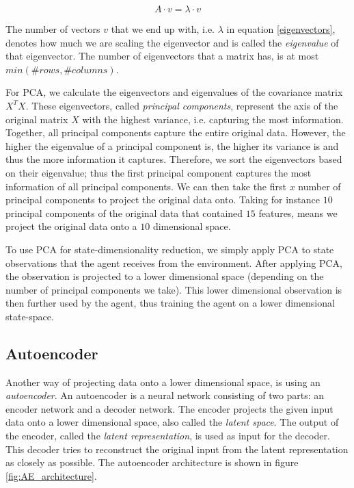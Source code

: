 \begin{equation}
\label{eigenvectors}
A \cdot v = \lambda \cdot v
\end{equation}

The number of vectors $v$ that we end up with, i.e. $\lambda$ in equation \ref{eigenvectors}, denotes how much we are scaling the eigenvector and is called the \emph{eigenvalue} of that eigenvector. The number of eigenvectors that a matrix has, is at most $min(\#rows, \#columns)$. 

For PCA, we calculate the eigenvectors and eigenvalues of the covariance matrix $X^TX$. These eigenvectors, called \emph{principal components}, represent the axis of the original matrix $X$ with the highest variance, i.e. capturing the most information. Together, all principal components capture the entire original data. However, the higher the eigenvalue of a principal component is, the higher its variance is and thus the more information it captures. Therefore, we sort the eigenvectors based on their eigenvalue; thus the first principal component captures the most information of all principal components. We can then take the first $x$ number of principal components to project the original data onto. Taking for instance $10$ principal components of the original data that contained $15$ features, means we project the original data onto a $10$ dimensional space.

To use PCA for state-dimensionality reduction, we simply apply PCA to state observations that the agent receives from the environment. After applying PCA, the observation is projected to a lower dimensional space (depending on the number of principal components we take). This lower dimensional observation is then further used by the agent, thus training the agent on a lower dimensional state-space.

\subsection{Autoencoder}\label{pl-ae}
Another way of projecting data onto a lower dimensional space, is using an \emph{autoencoder}\cite{AE_general}. An autoencoder is a neural network consisting of two parts: an encoder network and a decoder network. The encoder projects the given input data onto a lower dimensional space, also called the \emph{latent space}. The output of the encoder, called the \emph{latent representation}, is used as input for the decoder. This decoder tries to reconstruct the original input from the latent representation as closely as possible. The autoencoder architecture is shown in figure \ref{fig:AE_architecture}.

